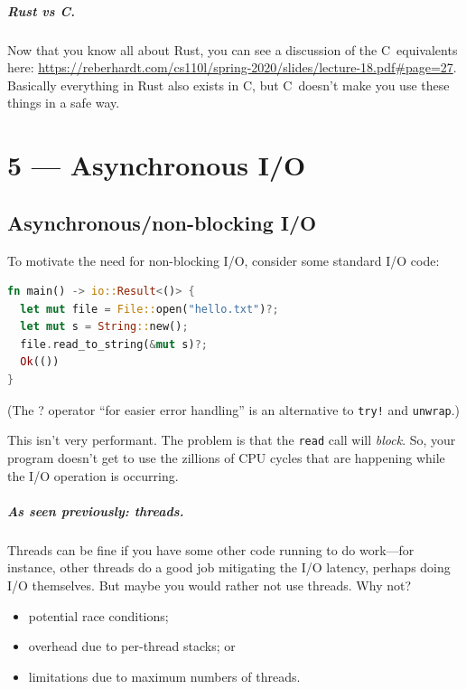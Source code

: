 \documentclass[a4paper]{report}
\newcommand{\CPP}{C\nolinebreak\hspace{-.05em}\raisebox{.4ex}{\tiny\bf +}\nolinebreak\hspace{-.10em}\raisebox{.4ex}{\tiny\bf +}}
\def\CPP{{C\nolinebreak[4]\hspace{-.05em}\raisebox{.4ex}{\tiny\bf ++}}}
\begin{document}
\paragraph{Rust vs \CPP.} Now that you know all about Rust, you can see a discussion of the \CPP~equivalents here: \url{https://reberhardt.com/cs110l/spring-2020/slides/lecture-18.pdf#page=27}. Basically everything in Rust also exists in \CPP, but \CPP~doesn't make you use these things in a safe way.









\chapter*{5 --- Asynchronous I/O}


\section*{Asynchronous/non-blocking I/O}

\begin{center}
\end{center}

To motivate the need for non-blocking I/O, consider some standard I/O code:

\begin{lstlisting}[language=Rust]
fn main() -> io::Result<()> {
  let mut file = File::open("hello.txt")?;
  let mut s = String::new();
  file.read_to_string(&mut s)?;
  Ok(()) 
}
\end{lstlisting}
(The ? operator ``for easier error handling'' is an alternative to
\texttt{try!} and \texttt{unwrap}.)

This isn't very performant. The problem is that the {\tt read} call will
{\em block}. So, your program doesn't get to use the zillions of CPU cycles that
are happening while the I/O operation is occurring.

\paragraph{As seen previously: threads.} Threads can be fine if
you have some other code running to do work---for instance, other threads
do a good job mitigating the I/O latency, perhaps doing I/O themselves.
But maybe you would rather not use threads. Why not?
\begin{itemize}[noitemsep,topsep=-1em]
\item potential race conditions;
\item overhead due to per-thread stacks; or
\item limitations due to maximum numbers of threads.
\end{itemize}
\end{document}
